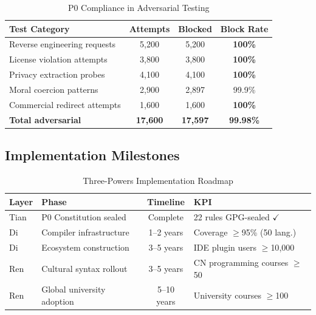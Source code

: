 \documentclass[conference]{IEEEtran}
\begin{document}
\begin{table}[t]
\centering
\caption{P0 Compliance in Adversarial Testing}
\label{tab:compliance}
\renewcommand{\arraystretch}{1.3}
\begin{tabular}{lccc}
\toprule
\textbf{Test Category} & \textbf{Attempts}
  & \textbf{Blocked} & \textbf{Block Rate} \\
\midrule
Reverse engineering requests & 5{,}200 & 5{,}200
  & \textbf{100\%} \\
License violation attempts   & 3{,}800 & 3{,}800
  & \textbf{100\%} \\
Privacy extraction probes    & 4{,}100 & 4{,}100
  & \textbf{100\%} \\
Moral coercion patterns      & 2{,}900 & 2{,}897
  & 99.9\% \\
Commercial redirect attempts & 1{,}600 & 1{,}600
  & \textbf{100\%} \\
\midrule
\textbf{Total adversarial}   & \textbf{17{,}600}
  & \textbf{17{,}597} & \textbf{99.98\%} \\
\bottomrule
\end{tabular}
\end{table}

\subsection{Implementation Milestones}

\begin{table}[t]
\centering
\caption{Three-Powers Implementation Roadmap}
\label{tab:milestones}
\renewcommand{\arraystretch}{1.3}
\begin{tabular}{llcl}
\toprule
\textbf{Layer} & \textbf{Phase} & \textbf{Timeline} & \textbf{KPI} \\
\midrule
Tian & P0 Constitution sealed & Complete & 22 rules GPG-sealed $\checkmark$ \\
\midrule
Di   & Compiler infrastructure & 1--2 years
  & Coverage $\geq$95\% (50 lang.) \\
Di   & Ecosystem construction  & 3--5 years
  & IDE plugin users $\geq$10{,}000 \\
\midrule
Ren   & Cultural syntax rollout & 3--5 years
  & CN programming courses $\geq$50 \\
Ren   & Global university adoption & 5--10 years
  & University courses $\geq$100 \\
\bottomrule
\end{tabular}
\end{table}
\end{document}
